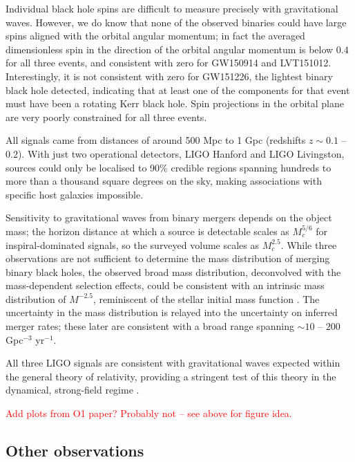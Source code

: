 \documentclass[iop,onecolumn]{revtex4}
\newcommand{\todo}[1]{\textcolor{red}{#1}}
\begin{document}
Individual black hole spins are difficult to measure precisely with gravitational waves.  However, we do know that none of the observed binaries could have large spins aligned with the orbital angular momentum; in fact the averaged dimensionless spin in the direction of the orbital angular momentum is below $0.4$ for all three events, and consistent with zero for GW150914 and LVT151012.  Interestingly, it is not consistent with zero for GW151226, the lightest binary black hole detected, indicating that at least one of the components for that event must have been a rotating Kerr black hole.  Spin projections in the orbital plane are very poorly constrained for all three events.

All signals came from distances of around 500 Mpc to 1 Gpc (redshifts $z\sim 0.1$ -- $0.2$).  With just two operational detectors, LIGO Hanford and LIGO Livingston, sources could only be localised to 90\% credible regions spanning hundreds to more than a thousand square degrees on the sky, making associations with specific host galaxies impossible.

Sensitivity to gravitational waves from binary mergers depends on the object mass; the horizon distance at which a source is detectable scales as $M_c^{5/6}$ for inspiral-dominated signals, so the surveyed volume scales as $M_c^{2.5}$.  While three observations are not sufficient to determine the mass distribution of merging binary black holes, the observed broad mass distribution, deconvolved with the mass-dependent selection effects, could be consistent with an intrinsic mass distribution of $M^{-2.5}$, reminiscent of the stellar initial mass function \citep{Salpeter:1955}.  The uncertainty in the mass distribution is relayed into the uncertainty on inferred merger rates; these later are consistent with a broad range spanning $\sim 10$ -- $200$ Gpc$^{-3}$ yr$^{-1}$.  

All three LIGO signals are consistent with gravitational waves expected within the general theory of relativity, providing a stringent test of this theory in the dynamical, strong-field regime \citep{GW150914:GR,BBH:O1}.

\todo{Add plots from O1 paper?  Probably not -- see above for figure idea.}

\subsection{Other observations}
\end{document}
